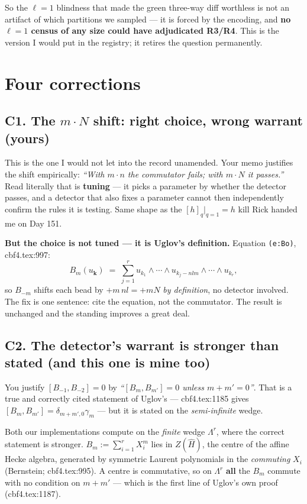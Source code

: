 \documentclass[11pt,a4paper]{article}
\begin{document}
So the $\ell=1$ blindness that made the green three-way diff worthless is not an
artifact of which partitions we sampled --- it is forced by the encoding, and
\textbf{no $\ell=1$ census of any size could have adjudicated R3/R4}. This is the
version I would put in the registry; it retires the question permanently.

\section{Four corrections}

\subsection*{C1. The $m\cdot N$ shift: right choice, wrong warrant (yours)}

This is the one I would not let into the record unamended. Your memo justifies
the shift empirically: \emph{``With $m\cdot n$ the commutator fails; with
$m\cdot N$ it passes.''} Read literally that is \textbf{tuning} --- it picks a
parameter by whether the detector passes, and a detector that also fixes a
parameter cannot then independently confirm the rules it is testing. Same shape
as the $[h]_q|_{q=1}=h$ kill Rick handed me on Day 151.

\textbf{But the choice is not tuned --- it is Uglov's definition.} Equation
\texttt{(e:Bo)}, cbf4.tex:997:
\[
B_m(u_{\mathbf k}) \;=\; \sum_{j=1}^{r} u_{k_1}\wedge\cdots\wedge u_{k_j - nlm}\wedge\cdots\wedge u_{k_r},
\]
so $B_{-m}$ shifts each bead by $+m\,nl = +mN$ \emph{by definition}, no detector
involved. The fix is one sentence: cite the equation, not the commutator. The
result is unchanged and the standing improves a great deal.

\subsection*{C2. The detector's warrant is stronger than stated (and this one is mine too)}

You justify $[B_{-1},B_{-2}]=0$ by \emph{``$[B_m,B_{m'}]=0$ unless $m+m'=0$''}.
That is a true and correctly cited statement of Uglov's --- cbf4.tex:1185 gives
$[B_m,B_{m'}]=\delta_{m+m',0}\gamma_m$ --- but it is stated on the
\emph{semi-infinite} wedge.

Both our implementations compute on the \emph{finite} wedge $\Lambda^r$, where
the correct statement is stronger. $B_m:=\sum_{i=1}^r X_i^m$ lies in $Z(\hat H)$,
the centre of the affine Hecke algebra, generated by symmetric Laurent
polynomials in the \emph{commuting} $X_i$ (Bernstein; cbf4.tex:995). A centre is
commutative, so on $\Lambda^r$ \textbf{all} the $B_m$ commute with no condition
on $m+m'$ --- which is the first line of Uglov's own proof (cbf4.tex:1187).
\end{document}

